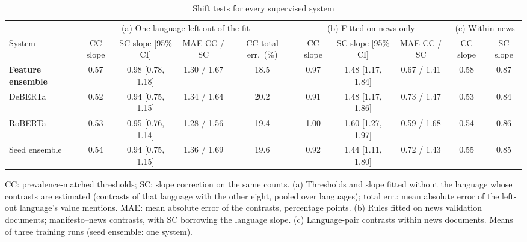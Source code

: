 \begin{table}[t]
\caption{Shift tests for every supervised system}
\label{tab:shift}
\centering
\scriptsize
\setlength{\tabcolsep}{3pt}
\begin{tabular*}{\textwidth}{@{\extracolsep{\fill}}l cccc ccc cc@{}}
\toprule
 & \multicolumn{4}{c}{(a) One language left out of the fit} & \multicolumn{3}{c}{(b) Fitted on news only} & \multicolumn{2}{c}{(c) Within news} \\
\cmidrule(lr){2-5}\cmidrule(lr){6-8}\cmidrule(l){9-10}
System & CC slope & SC slope [95\% CI] & MAE CC / SC & CC total err.\ (\%) & CC slope & SC slope [95\% CI] & MAE CC / SC & CC slope & SC slope \\
\midrule
\textbf{Feature ensemble} & 0.57 & 0.98 [0.78, 1.18] & 1.30 / 1.67 & 18.5 & 0.97 & 1.48 [1.17, 1.84] & 0.67 / 1.41 & 0.58 & 0.87 \\
DeBERTa & 0.52 & 0.94 [0.75, 1.15] & 1.34 / 1.64 & 20.2 & 0.91 & 1.48 [1.17, 1.86] & 0.73 / 1.47 & 0.53 & 0.84 \\
RoBERTa & 0.53 & 0.95 [0.76, 1.14] & 1.28 / 1.56 & 19.4 & 1.00 & 1.60 [1.27, 1.97] & 0.59 / 1.68 & 0.54 & 0.86 \\
Seed ensemble & 0.54 & 0.94 [0.75, 1.15] & 1.36 / 1.69 & 19.6 & 0.92 & 1.44 [1.11, 1.80] & 0.72 / 1.43 & 0.55 & 0.85 \\
\bottomrule
\end{tabular*}
\par\vspace{2pt}
\begin{minipage}{\textwidth}\scriptsize CC: prevalence-matched thresholds; SC: slope correction on the same counts. (a) Thresholds and slope fitted without the language whose contrasts are estimated (contrasts of that language with the other eight, pooled over languages); total err.: mean absolute error of the left-out language's value mentions. MAE: mean absolute error of the contrasts, percentage points. (b) Rules fitted on news validation documents; manifesto--news contrasts, with SC borrowing the language slope. (c) Language-pair contrasts within news documents. Means of three training runs (seed ensemble: one system).\end{minipage}
\end{table}

